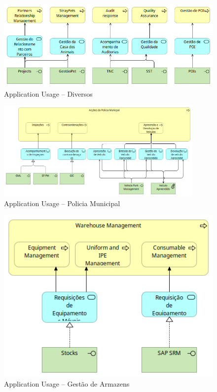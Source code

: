 \documentclass[12pt,a4paper,final]{article}
\begin{document}
    \begin{figure}[H]
        \centering
        \includegraphics[width=\textwidth]{Q10_5}
        \caption{Application Usage – Diversos}
        \label{fig:q10_5}
    \end{figure}

    \begin{figure}[H]
        \centering
        \includegraphics[width=0.9\textwidth]{Q10_6}
        \caption{Application Usage – Policia Municipal}
        \label{fig:q10_6}
    \end{figure}

    \begin{figure}[H]
        \centering
        \includegraphics[width=\textwidth]{Q10_7}
        \caption{Application Usage – Gestão de Armazens}
        \label{fig:q10_7}
    \end{figure}
\end{document}
